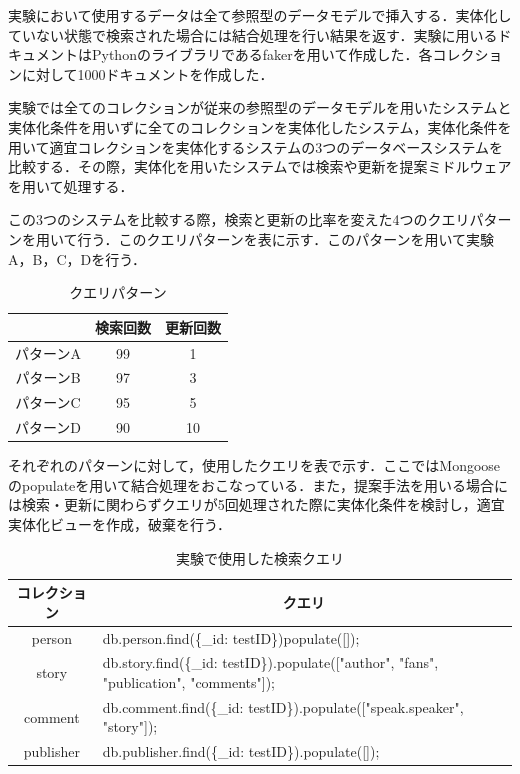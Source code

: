 \documentclass[a4paper,11pt]{ujreport}
\begin{document}
実験において使用するデータは全て参照型のデータモデルで挿入する．実体化していない状態で検索された場合には結合処理を行い結果を返す．実験に用いるドキュメントはPythonのライブラリであるfaker\cite{faker}を用いて作成した．各コレクションに対して1000ドキュメントを作成した．


実験では全てのコレクションが従来の参照型のデータモデルを用いたシステムと実体化条件を用いずに全てのコレクションを実体化したシステム，実体化条件を用いて適宜コレクションを実体化するシステムの3つのデータベースシステムを比較する．その際，実体化を用いたシステムでは検索や更新を提案ミドルウェアを用いて処理する．

この3つのシステムを比較する際，検索と更新の比率を変えた4つのクエリパターンを用いて行う．このクエリパターンを表に示す．このパターンを用いて実験A，B，C，Dを行う．
\begin{table}[htb]
  \begin{center}
    \caption{クエリパターン}
		\label{table:experiment_query_pattern}
    \begin{tabular}{|c|c|c|} \hline
        & 検索回数 & 更新回数 \\ \hline
      パターンA & 99 & 1\\ \hline
      パターンB & 97 & 3\\ \hline
			パターンC & 95 & 5\\ \hline
      パターンD & 90 & 10\\ \hline
    \end{tabular}
  \end{center}
\end{table}
それぞれのパターンに対して，使用したクエリを表で示す．ここではMongooseのpopulateを用いて結合処理をおこなっている．また，提案手法を用いる場合には検索・更新に関わらずクエリが5回処理された際に実体化条件を検討し，適宜実体化ビューを作成，破棄を行う．
\begin{table}[htb]
  \begin{center}
    \caption{実験で使用した検索クエリ}
		\label{table:ExperimentFindQuery}
    \begin{tabular}{|c|l|} \hline
      コレクション & \multicolumn{1}{|c|}{クエリ}\\ \hline
      person & db.person.find(\{\_id: testID\})populate([]);\\ \hline
			story & db.story.find(\{\_id: testID\}).populate(["author", "fans", "publication", "comments"]);\\ \hline
      comment & db.comment.find(\{\_id: testID\}).populate(["speak.speaker", "story"]);\\ \hline
      publisher & db.publisher.find(\{\_id: testID\}).populate([]);\\ \hline
    \end{tabular}
  \end{center}
\end{table}
\end{document}
